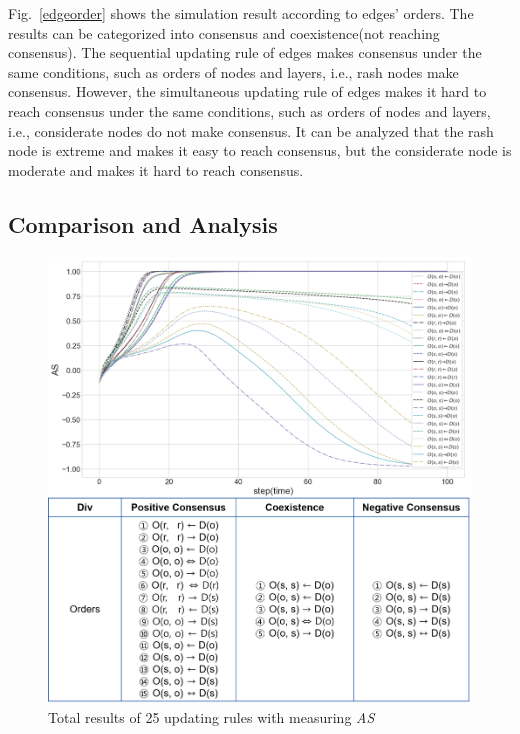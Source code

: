 Fig.~\ref{edgeorder} shows the simulation result according to edges' orders. The results can be categorized into consensus and coexistence(not reaching consensus). The sequential updating rule of edges makes consensus under the same conditions, such as orders of nodes and layers, i.e., rash nodes make consensus. However, the simultaneous updating rule of edges makes it hard to reach consensus under the same conditions, such as orders of nodes and layers, i.e., considerate nodes do not make consensus. It can be analyzed that the rash node is extreme and makes it easy to reach consensus, but the considerate node is moderate and makes it hard to reach consensus.\\
 
\subsection{Comparison and Analysis}
\begin{figure}[!htb]
	\centering
	\includegraphics[width=\hsize]{figure/chap4_ordertotal.png}
	\caption{Total results of 25 updating rules with measuring \textit{AS}}
	\label{ordertotal}
\end{figure}

